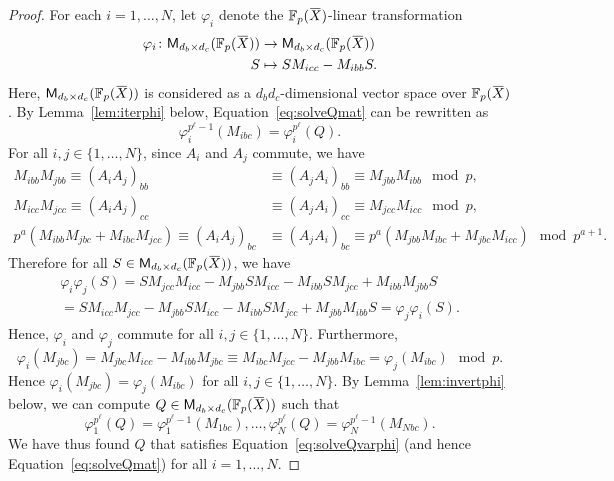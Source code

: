 \documentclass[letterpaper, 11pt, thm-restate]{article}
\numberwithin{equation}{section}
\newcommand{\F}{\mathbb{F}}
\newcommand{\M}{\mathsf{M}}
\newcommand{\oX}{\mkern 1.5mu\overline{\mkern-1.5mu X \mkern-1.5mu}\mkern 1.5mu}
\theoremstyle{definition}
\theoremstyle{definition}
\theoremstyle{definition}
\begin{document}
\begin{proof}
    For each $i = 1, \ldots, N$, let $\varphi_i$ denote the $\F_p(\oX)$-linear transformation
    \begin{align*}
        \varphi_i \colon \M_{d_b \times d_c}(\F_p(\oX)) & \rightarrow \M_{d_b \times d_c}(\F_p(\oX)) \\
        S & \mapsto S M_{icc} - M_{ibb} S.
    \end{align*}
    Here, $\M_{d_b \times d_c}(\F_p(\oX))$ is considered as a $d_bd_c$-dimensional vector space over $\F_p(\oX)$.
    By Lemma~\ref{lem:iterphi} below, Equation~\eqref{eq:solveQmat} can be rewritten as
    \begin{equation}\label{eq:solveQvarphi}
    \varphi_{i}^{p^{\ell}-1} (M_{ibc}) = \varphi_{i}^{p^{\ell}}(Q).
    \end{equation}
    For all $i,j \in \{1, \ldots, N\}$, since $A_i$ and $A_j$ commute, we have 
    \begin{align*}
    M_{ibb}M_{jbb} \equiv (A_iA_j)_{bb} & \equiv (A_jA_i)_{bb} \equiv M_{jbb}M_{ibb} \mod p, \\
    M_{icc}M_{jcc} \equiv (A_iA_j)_{cc} & \equiv (A_jA_i)_{cc} \equiv M_{jcc}M_{icc} \mod p, \\
    p^a(M_{ibb} M_{jbc} + M_{ibc} M_{jcc}) \equiv (A_iA_j)_{bc} & \equiv (A_jA_i)_{bc} \equiv p^a(M_{jbb} M_{ibc} + M_{jbc} M_{icc}) \mod p^{a+1}.
    \end{align*}
    Therefore for all $S \in \M_{d_b \times d_c}(\F_p(\oX))$, we have
    \begin{multline*}
    \varphi_i\varphi_j(S) = S M_{jcc} M_{icc} - M_{jbb} S M_{icc} - M_{ibb} S M_{jcc} + M_{ibb} M_{jbb} S \\
    = S M_{icc} M_{jcc} - M_{jbb} S M_{icc} - M_{ibb} S M_{jcc} + M_{jbb} M_{ibb} S = \varphi_j\varphi_i(S).
    \end{multline*}
    Hence, $\varphi_i$ and $\varphi_j$ commute for all $i,j \in \{1, \ldots, N\}$. 
    Furthermore,
    \[
    \varphi_i(M_{jbc}) = M_{jbc} M_{icc} - M_{ibb} M_{jbc} \equiv M_{ibc} M_{jcc} - M_{jbb} M_{ibc} = \varphi_j(M_{ibc}) \mod p.
    \]
    Hence $\varphi_i(M_{jbc}) = \varphi_j(M_{ibc})$ for all $i,j \in \{1, \ldots, N\}$.
    By Lemma~\ref{lem:invertphi} below, we can compute $Q \in \M_{d_b \times d_c}(\F_p(\oX))$ such that
    \[
    \varphi_1^{p^{\ell}}(Q) = \varphi_1^{p^{\ell}-1}(M_{1bc}), \ldots, \varphi_N^{p^{\ell}}(Q) = \varphi_N^{p^{\ell}-1}(M_{Nbc}).
    \]
    We have thus found $Q$ that satisfies Equation~\eqref{eq:solveQvarphi} (and hence Equation~\eqref{eq:solveQmat}) for all $i = 1, \ldots, N$.
\end{proof}
\end{document}
